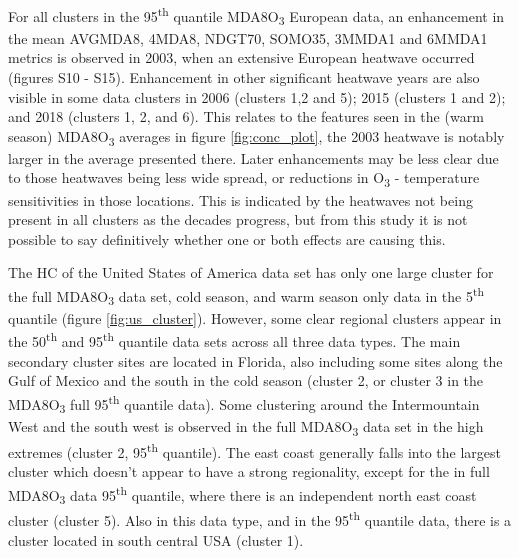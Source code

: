 \documentclass[journal abbreviation, manuscript]{copernicus}
\begin{document}
For all clusters in the 95\textsuperscript{th} quantile MDA8O\textsubscript{3} European data, an enhancement in the mean AVGMDA8, 4MDA8, NDGT70, SOMO35, 3MMDA1 and 6MMDA1 metrics is observed in 2003, when an extensive European heatwave occurred (figures S10 - S15). Enhancement in other significant heatwave years are also visible in some data clusters in 2006 (clusters 1,2 and 5); 2015 (clusters 1 and 2); and 2018 (clusters 1, 2, and 6). This relates to the features seen in the (warm season) MDA8O\textsubscript{3} averages in figure \ref{fig:conc_plot}, the 2003 heatwave is notably larger in the average presented there. Later enhancements may be less clear due to those heatwaves being less wide spread, or reductions in O\textsubscript{3} - temperature sensitivities in those locations. This is indicated by the heatwaves not being present in all clusters as the decades progress, but from this study it is not possible to say definitively whether one or both effects are causing this.

The HC of the United States of America data set has only one large cluster for the full MDA8O\textsubscript{3} data set, cold season, and warm season only data in the 5\textsuperscript{th} quantile (figure \ref{fig:us_cluster}). However, some clear regional clusters appear in the 50\textsuperscript{th} and 95\textsuperscript{th} quantile data sets across all three data types. The main secondary cluster sites are located in Florida, also including some sites along the Gulf of Mexico and the south in the cold season (cluster 2, or cluster 3 in the MDA8O\textsubscript{3} full 95\textsuperscript{th} quantile data). Some clustering around the Intermountain West and the south west is observed in the full MDA8O\textsubscript{3} data set in the high extremes (cluster 2, 95\textsuperscript{th} quantile). The east coast generally falls into the largest cluster which doesn't appear to have a strong regionality, except for the in full MDA8O\textsubscript{3} data 95\textsuperscript{th} quantile, where there is an independent north east coast cluster (cluster 5). Also in this data type, and in the 95\textsuperscript{th} quantile data, there is a cluster located in south central USA (cluster 1).
\end{document}
